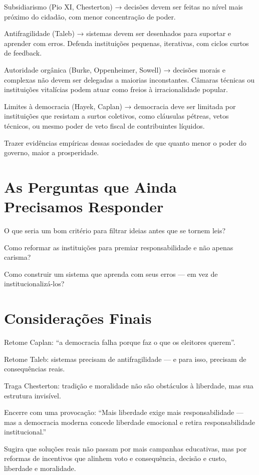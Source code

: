 Subsidiarismo (Pio XI, Chesterton) → decisões devem ser feitas no nível mais próximo do cidadão, com menor concentração de poder.

Antifragilidade (Taleb) → sistemas devem ser desenhados para suportar e aprender com erros. Defenda instituições pequenas, iterativas, com ciclos curtos de feedback.

Autoridade orgânica (Burke, Oppenheimer, Sowell) → decisões morais e complexas não devem ser delegadas a maiorias inconstantes. Câmaras técnicas ou instituições vitalícias podem atuar como freios à irracionalidade popular.

Limites à democracia (Hayek, Caplan) → democracia deve ser limitada por instituições que resistam a surtos coletivos, como cláusulas pétreas, vetos técnicos, ou mesmo poder de veto fiscal de contribuintes líquidos.

Trazer evidências empíricas dessas sociedades de que quanto menor o poder do governo, maior a prosperidade.



\section{As Perguntas que Ainda Precisamos Responder} %


O que seria um bom critério para filtrar ideias antes que se tornem leis?

Como reformar as instituições para premiar responsabilidade e não apenas carisma?

Como construir um sistema que aprenda com seus erros — em vez de institucionalizá-los?


\section{Considerações Finais} %

Retome Caplan: ``a democracia falha porque faz o que os eleitores querem''.

Retome Taleb: sistemas precisam de antifragilidade — e para isso, precisam de consequências reais.

Traga Chesterton: tradição e moralidade não são obstáculos à liberdade, mas sua estrutura invisível.

Encerre com uma provocação: ``Mais liberdade exige mais responsabilidade — mas a democracia moderna concede liberdade emocional e retira responsabilidade institucional.''

Sugira que soluções reais não passam por mais campanhas educativas, mas por reformas de incentivos que alinhem voto e consequência, decisão e custo, liberdade e moralidade.

